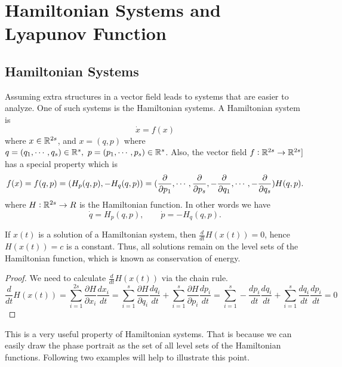 \section{Hamiltonian Systems and Lyapunov Function}

\subsection{Hamiltonian Systems}

Assuming extra structures in a vector field leads to systems that are easier to analyze. One of such systems is the Hamiltonian systems. A Hamiltonian system is
\[ \dot{x} = f(x) \]
where $x \in \mathbb{R}^{2s}$, and $x = (q,p)$ where $q=(q_1,\cdots,q_s)\in\R^s,\ p=(p_1,\cdots,p_s)\in\R^s$. Also, the vector field $f: \mathbb{R}^{2s}\to \mathbb{R}^{2s}]$ has a special property which is
\[ f(x)=f(q,p)=(H_p(q,p),-H_q(q,p)) = (\frac{\partial}{\partial p_1},\cdots,\frac{\partial}{\partial p_s},-\frac{\partial}{\partial q_1},\cdots,-\frac{\partial}{\partial q_s})H(q,p). \]
where $H: \mathbb{R}^{2s}\to R$ is the Hamiltonian function. In other words we have
\[ \dot{q} = H_p (q,p),\qquad \dot{p}=- H_q(q,p). \]



\begin{corbox}
	If $x(t)$ is a solution of a Hamiltonian system, then $\frac{d}{dt} H(x(t)) = 0$, hence $H(x(t))=c$ is a constant. Thus, all solutions remain on the level sets of the Hamiltonian function, which is known as conservation of energy.
\end{corbox}
\begin{proof}
	We need to calculate $\frac{d}{dt}H(x(t))$ via the chain rule.
	\[ \frac{d}{dt}H(x(t)) = \sum_{i=1}^{2s} \frac{\partial H}{\partial x_i} \frac{d x_i}{dt} = \sum_{i=1}^{s} \frac{\partial H}{\partial q_i} \frac{d q_i}{dt} + \sum_{i=1}^{s} \frac{\partial H}{\partial p_i} \frac{d p_i}{dt} = \sum_{i=1}^{s} -\frac{d p_i}{d t} \frac{d q_i}{dt} + \sum_{i=1}^{s} \frac{d q_i}{d t} \frac{d p_i}{dt} = 0\]
\end{proof}


This is a very useful property of Hamiltonian systems. That is because we can easily draw the phase portrait as the set of all level sets of the Hamiltonian functions. Following two examples will help to illustrate this point. 

